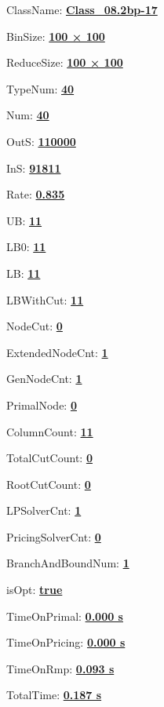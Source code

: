 \documentclass[11pt]{article}
\begin{document}
\pagestyle{empty}


ClassName: \underline{\textbf{Class_08.2bp-17}}
\par
BinSize: \underline{\textbf{100 × 100}}
\par
ReduceSize: \underline{\textbf{100 × 100}}
\par
TypeNum: \underline{\textbf{40}}
\par
Num: \underline{\textbf{40}}
\par
OutS: \underline{\textbf{110000}}
\par
InS: \underline{\textbf{91811}}
\par
Rate: \underline{\textbf{0.835}}
\par
UB: \underline{\textbf{11}}
\par
LB0: \underline{\textbf{11}}
\par
LB: \underline{\textbf{11}}
\par
LBWithCut: \underline{\textbf{11}}
\par
NodeCut: \underline{\textbf{0}}
\par
ExtendedNodeCnt: \underline{\textbf{1}}
\par
GenNodeCnt: \underline{\textbf{1}}
\par
PrimalNode: \underline{\textbf{0}}
\par
ColumnCount: \underline{\textbf{11}}
\par
TotalCutCount: \underline{\textbf{0}}
\par
RootCutCount: \underline{\textbf{0}}
\par
LPSolverCnt: \underline{\textbf{1}}
\par
PricingSolverCnt: \underline{\textbf{0}}
\par
BranchAndBoundNum: \underline{\textbf{1}}
\par
isOpt: \underline{\textbf{true}}
\par
TimeOnPrimal: \underline{\textbf{0.000 s}}
\par
TimeOnPricing: \underline{\textbf{0.000 s}}
\par
TimeOnRmp: \underline{\textbf{0.093 s}}
\par
TotalTime: \underline{\textbf{0.187 s}}
\par
\newpage


\end{document}
